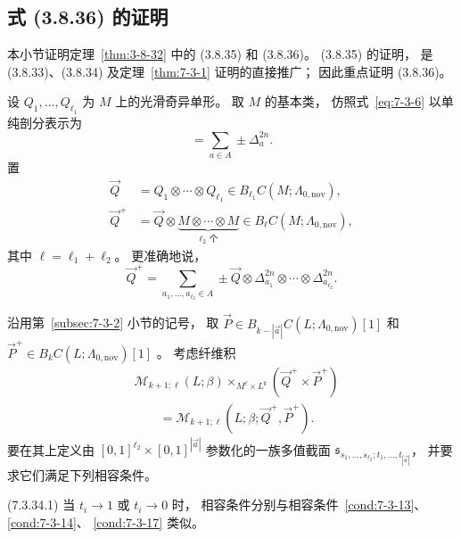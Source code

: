 
\subsection{式 (3.8.36) 的证明}
\label{subsec:7-3-3}

本小节证明定理~\ref{thm:3-8-32}
中的 (3.8.35) 和 (3.8.36)。
(3.8.35) 的证明，
是 (3.8.33)、(3.8.34)
及定理~\ref{thm:7-3-1} 证明的直接推广；
因此重点证明 (3.8.36)。

设 $Q_1,\ldots,Q_{\ell_1}$
为 $M$ 上的光滑奇异单形。
取 $M$ 的基本类，
仿照式~\eqref{eq:7-3-6}
以单纯剖分表示为
\begin{equation}
[M]=\sum_{a\in A}\pm\Delta_a^{2n}.
\tag{7.3.31}\label{eq:7-3-31}
\end{equation}
置
\begin{align}
\vec Q
&=Q_1\otimes\cdots\otimes Q_{\ell_1}
\in B_{\ell_1}C(M;\Lambda_{0,\mathrm{nov}}),
\tag{7.3.32.1}\label{eq:7-3-32-1}\\
\vec Q^+
&=\vec Q\otimes
\underbrace{M\otimes\cdots\otimes M}_{\ell_2\text{ 个}}
\in B_\ell C(M;\Lambda_{0,\mathrm{nov}}),
\tag{7.3.32.2}\label{eq:7-3-32-2}
\end{align}
其中 $\ell=\ell_1+\ell_2$。
更准确地说，
\[
\vec Q^+
=\sum_{a_1,\ldots,a_{\ell_2}\in A}
\pm\vec Q\otimes
\Delta_{a_1}^{2n}\otimes\cdots
\otimes\Delta_{a_{\ell_2}}^{2n}.
\]

沿用第~\ref{subsec:7-3-2} 小节的记号，
取
$\vec P\in
B_{k-|\vec a|}C(L;\Lambda_{0,\mathrm{nov}})[1]$
和
$\vec P^+\in
B_kC(L;\Lambda_{0,\mathrm{nov}})[1]$
。
考虑纤维积
\begin{equation}
\begin{aligned}
&\mathcal M_{k+1;\ell}(L;\beta)
\times_{M^\ell\times L^k}
(\vec Q^+\times\vec P^+)\\
&\qquad=
\mathcal M_{k+1;\ell}
(L;\beta;\vec Q^+,\vec P^+).
\end{aligned}
\tag{7.3.33}\label{eq:7-3-33}
\end{equation}
要在其上定义由
$[0,1]^{\ell_2}\times[0,1]^{|\vec a|}$
参数化的一族多值截面
$\mathfrak s_{s_1,\ldots,s_{\ell_2};
t_1,\ldots,t_{|\vec a|}}$，
并要求它们满足下列相容条件。

\par\noindent\textup{(7.3.34.1)}\label{cond:7-3-34-1}\quad
当 $t_i\to1$ 或 $t_i\to0$ 时，
相容条件分别与相容条件~\ref{cond:7-3-13}、
\ref{cond:7-3-14}、
\ref{cond:7-3-17} 类似。

